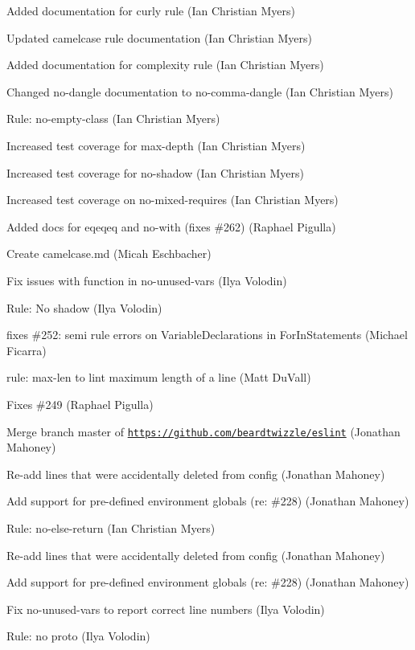 \begin{DoxyItemize}
\item Added documentation for {\ttfamily curly} rule (Ian Christian Myers)
\item Updated {\ttfamily camelcase} rule documentation (Ian Christian Myers)
\item Added documentation for {\ttfamily complexity} rule (Ian Christian Myers)
\item Changed {\ttfamily no-\/dangle} documentation to {\ttfamily no-\/comma-\/dangle} (Ian Christian Myers)
\item Rule\+: no-\/empty-\/class (Ian Christian Myers)
\item Increased test coverage for max-\/depth (Ian Christian Myers)
\item Increased test coverage for no-\/shadow (Ian Christian Myers)
\item Increased test coverage on no-\/mixed-\/requires (Ian Christian Myers)
\item Added docs for eqeqeq and no-\/with (fixes \#262) (Raphael Pigulla)
\item Create camelcase.\+md (Micah Eschbacher)
\item Fix issues with function in no-\/unused-\/vars (Ilya Volodin)
\item Rule\+: No shadow (Ilya Volodin)
\item fixes \#252\+: semi rule errors on Variable\+Declarations in For\+In\+Statements (Michael Ficarra)
\item rule\+: max-\/len to lint maximum length of a line (Matt Du\+Vall)
\item Fixes \#249 (Raphael Pigulla)
\item Merge branch \textquotesingle{}master\textquotesingle{} of \href{https://github.com/beardtwizzle/eslint}{\tt https\+://github.\+com/beardtwizzle/eslint} (Jonathan Mahoney)
\item Re-\/add lines that were accidentally deleted from config (Jonathan Mahoney)
\item Add support for pre-\/defined environment globals (re\+: \#228) (Jonathan Mahoney)
\item Rule\+: no-\/else-\/return (Ian Christian Myers)
\item Re-\/add lines that were accidentally deleted from config (Jonathan Mahoney)
\item Add support for pre-\/defined environment globals (re\+: \#228) (Jonathan Mahoney)
\item Fix no-\/unused-\/vars to report correct line numbers (Ilya Volodin)
\item Rule\+: no proto (Ilya Volodin)

\end{DoxyItemize}
